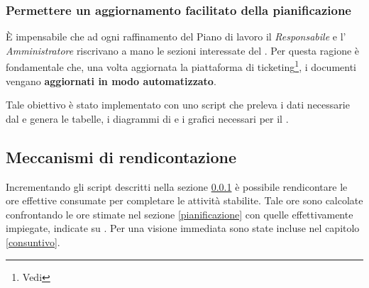 \subsubsection{Permettere un aggiornamento facilitato della pianificazione}
\label{script}
È impensabile che ad ogni raffinamento del Piano di lavoro il \emph{Responsabile} e l' \emph{Amministratore} riscrivano a mano le sezioni interessate del \PianoDiProgetto.
Per questa ragione è fondamentale che, una volta aggiornata la piattaforma di ticketing\footnote{Vedi \NormeDiProgetto}, i documenti vengano \textbf{aggiornati in modo automatizzato}.

Tale obiettivo è stato implementato con uno script che preleva i dati necessarie dal  e genera le tabelle, i diagrammi di  e i grafici necessari per il \PianoDiProgetto.

\subsection{Meccanismi di rendicontazione}

Incrementando gli script descritti nella sezione \ref{script} è possibile rendicontare le ore effettive consumate per completare le attività stabilite.
Tale ore sono calcolate confrontando le ore stimate nel \PianoDiProgetto sezione \ref{pianificazione} con quelle effettivamente impiegate, indicate su .
Per una visione immediata sono state incluse nel capitolo \ref{consuntivo}.


